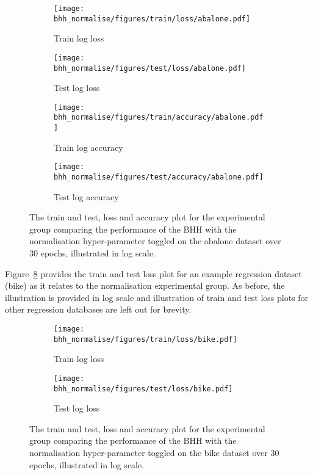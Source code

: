 \begin{figure}[H]
	\begin{subfigure}{0.5\textwidth}
		\centering
		\texttt{[image: bhh\_normalise/figures/train/loss/abalone.pdf]}
		\caption{Train log loss}
		\label{fig:results:normalise:figures:loss:train:abalone}
	\end{subfigure}
	\begin{subfigure}{0.5\textwidth}
		\centering
		\texttt{[image: bhh\_normalise/figures/test/loss/abalone.pdf]}
		\caption{Test log loss}
		\label{fig:results:normalise:figures:loss:test:abalone}
	\end{subfigure}
	\par\bigskip
	\begin{subfigure}{0.5\textwidth}
		\centering
		\texttt{[image: bhh\_normalise/figures/train/accuracy/abalone.pdf]}
		\caption{Train log accuracy}
		\label{fig:results:normalise:figures:accuracy:train:abalone}
	\end{subfigure}
	\begin{subfigure}{0.5\textwidth}
		\centering
		\texttt{[image: bhh\_normalise/figures/test/accuracy/abalone.pdf]}
		\caption{Test log accuracy}
		\label{fig:results:normalise:figures:accuracy:test:abalone}
	\end{subfigure}
	\par\bigskip
	\caption{The train and test, loss and accuracy plot for the experimental group comparing the performance of the \acs{BHH} with the normalisation hyper-parameter toggled on the abalone dataset over 30 epochs, illustrated in log scale.}
	\label{fig:results:normalise:figures:abalone}
\end{figure}


Figure~\ref{fig:results:normalise:figures:bike} provides the train and test loss plot for an example regression dataset (bike) as it relates to the normalisation experimental group. As before, the illustration is provided in log scale and illustration of train and test loss plots for other regression databases are left out for brevity.


\begin{figure}[H]
	\begin{subfigure}{0.5\textwidth}
		\centering
		\texttt{[image: bhh\_normalise/figures/train/loss/bike.pdf]}
		\caption{Train log loss}
		\label{fig:results:normalise:figures:loss:train:bike}
	\end{subfigure}
	\begin{subfigure}{0.5\textwidth}
		\centering
		\texttt{[image: bhh\_normalise/figures/test/loss/bike.pdf]}
		\caption{Test log loss}
		\label{fig:results:normalise:figures:loss:test:bike}
	\end{subfigure}
	\par\bigskip
	\caption{The train and test, loss and accuracy plot for the experimental group comparing the performance of the \acs{BHH} with the normalisation hyper-parameter toggled on the bike dataset over 30 epochs, illustrated in log scale.}
	\label{fig:results:normalise:figures:bike}
\end{figure}


